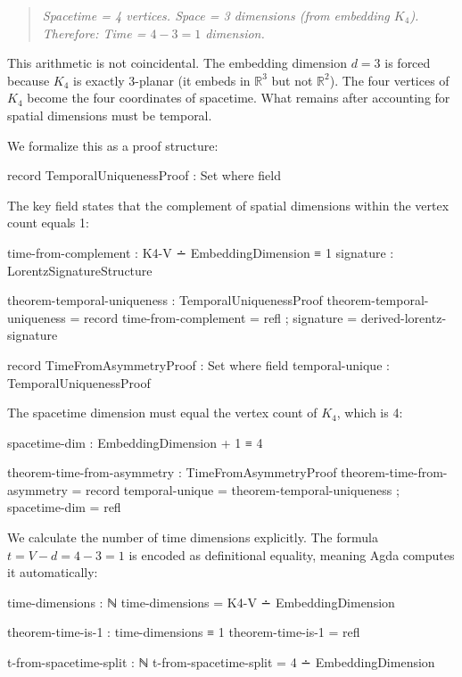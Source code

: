 \documentclass[11pt,a4paper]{book}
\begin{document}
\begin{quote}
\emph{Spacetime = 4 vertices. Space = 3 dimensions (from embedding $K_4$).\\
Therefore: Time = $4 - 3 = 1$ dimension.}
\end{quote}

This arithmetic is not coincidental. The embedding dimension $d = 3$ is forced because $K_4$ 
is exactly 3-planar (it embeds in $\mathbb{R}^3$ but not $\mathbb{R}^2$). The four vertices 
of $K_4$ become the four coordinates of spacetime. What remains after accounting for spatial 
dimensions must be temporal.

We formalize this as a proof structure:

\begin{code}
record TemporalUniquenessProof : Set where
  field
\end{code}

The key field states that the complement of spatial dimensions within the vertex count equals 1:

\begin{code}
    time-from-complement : K4-V ∸ EmbeddingDimension ≡ 1
    signature : LorentzSignatureStructure
    
theorem-temporal-uniqueness : TemporalUniquenessProof
theorem-temporal-uniqueness = record 
  { time-from-complement = refl
  ; signature = derived-lorentz-signature
  }

record TimeFromAsymmetryProof : Set where
  field
    temporal-unique : TemporalUniquenessProof
\end{code}

The spacetime dimension must equal the vertex count of $K_4$, which is 4:

\begin{code}
    spacetime-dim : EmbeddingDimension + 1 ≡ 4

theorem-time-from-asymmetry : TimeFromAsymmetryProof
theorem-time-from-asymmetry = record
  { temporal-unique = theorem-temporal-uniqueness
  ; spacetime-dim = refl
  }
\end{code}

We calculate the number of time dimensions explicitly. The formula $t = V - d = 4 - 3 = 1$ 
is encoded as definitional equality, meaning Agda computes it automatically:

\begin{code}
time-dimensions : ℕ
time-dimensions = K4-V ∸ EmbeddingDimension

theorem-time-is-1 : time-dimensions ≡ 1
theorem-time-is-1 = refl

t-from-spacetime-split : ℕ
t-from-spacetime-split = 4 ∸ EmbeddingDimension
\end{code}
\end{document}
